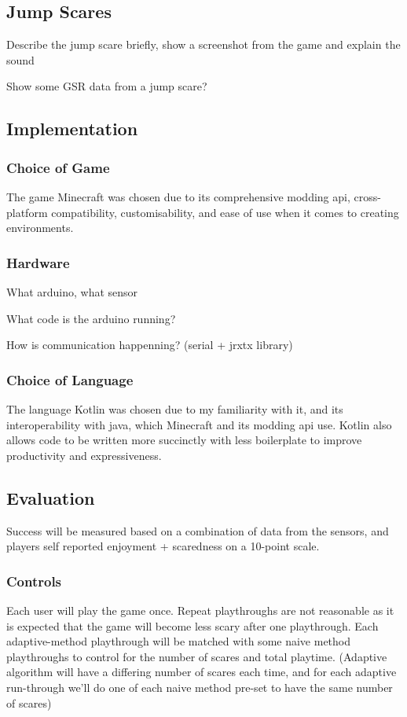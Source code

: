 \documentclass[12pt,a4paper]{article}
\begin{document}
\subsection{Jump Scares}
Describe the jump scare briefly, show a screenshot from the game and explain the sound

Show some GSR data from a jump scare?

\subsection{Implementation}

\subsubsection{Choice of Game}
The game Minecraft was chosen due to its comprehensive modding api, cross-platform compatibility, customisability, and ease of use when it comes to creating environments.

\subsubsection{Hardware}
What arduino, what sensor

What code is the arduino running?

How is communication happenning? (serial + jrxtx library)

\subsubsection{Choice of Language}
The language Kotlin was chosen due to my familiarity with it, and its interoperability with java, which Minecraft and its modding api use. Kotlin also allows code to be written more succinctly with less boilerplate to improve productivity and expressiveness.

\subsection{Evaluation}
Success will be measured based on a combination of data from the sensors, and players self reported enjoyment + scaredness on a 10-point scale.

\subsubsection{Controls}
Each user will play the game once. Repeat playthroughs are not reasonable as it is expected that the game will become less scary after one playthrough. Each adaptive-method playthrough will be matched with some naive method playthroughs to control for the number of scares and total playtime. (Adaptive algorithm will have a differing number of scares each time, and for each adaptive run-through we'll do one of each naive method pre-set to have the same number of scares)
\end{document}
